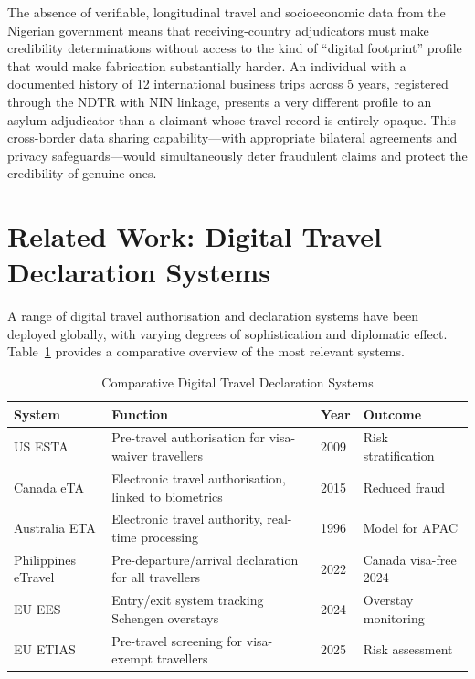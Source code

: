 \documentclass[11pt]{article}
\begin{document}
The absence of verifiable, longitudinal travel and socioeconomic data
from the Nigerian government means that receiving-country adjudicators
must make credibility determinations without access to the kind of
``digital footprint'' profile that would make fabrication substantially
harder. An individual with a documented history of 12 international
business trips across 5 years, registered through the NDTR with NIN
linkage, presents a very different profile to an asylum adjudicator
than a claimant whose travel record is entirely opaque.
This cross-border data sharing capability---with appropriate bilateral
agreements and privacy safeguards---would simultaneously deter
fraudulent claims and protect the credibility of genuine ones.

\section{Related Work: Digital Travel Declaration Systems}
\label{sec:related}

A range of digital travel authorisation and declaration systems have
been deployed globally, with varying degrees of sophistication and
diplomatic effect. Table~\ref{tab:systems} provides a comparative
overview of the most relevant systems.

\begin{table}[ht]
\caption{Comparative Digital Travel Declaration Systems}
\label{tab:systems}
\small
\begin{tabularx}{\columnwidth}{@{}lXll@{}}
\toprule
\textbf{System} & \textbf{Function} & \textbf{Year} & \textbf{Outcome} \\
\midrule
US ESTA         & Pre-travel authorisation for visa-waiver travellers & 2009 & Risk stratification \\
Canada eTA      & Electronic travel authorisation, linked to biometrics & 2015 & Reduced fraud \\
Australia ETA   & Electronic travel authority, real-time processing & 1996 & Model for APAC \\
Philippines eTravel & Pre-departure/arrival declaration for all travellers & 2022 & Canada visa-free 2024 \\
EU EES          & Entry/exit system tracking Schengen overstays & 2024 & Overstay monitoring \\
EU ETIAS        & Pre-travel screening for visa-exempt travellers & 2025 & Risk assessment \\
\bottomrule
\end{tabularx}
\end{table}
\end{document}
